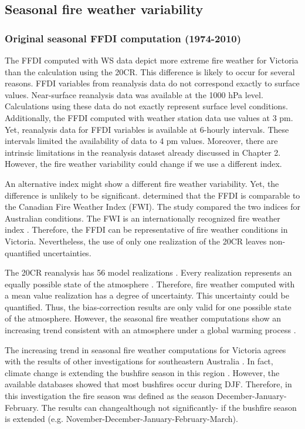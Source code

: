 \subsection{Seasonal fire weather variability \label{sub:Seasonal-fire-weather-variability}}


\subsubsection{Original seasonal FFDI computation (1974-2010)}

The FFDI computed with WS data depict more extreme fire weather for
Victoria than the calculation using the 20CR. This difference is likely
to occur for several reasons. FFDI variables from reanalysis data
do not correspond exactly to surface values. Near-surface reanalysis
data was available at the 1000 hPa level. Calculations using these
data do not exactly represent surface level conditions. Additionally,
the FFDI computed with weather station data use values at 3 pm. Yet,
reanalysis data for FFDI variables is available at 6-hourly intervals.
These intervals limited the availability of data to 4 pm values. Moreover,
there are intrinsic limitations in the reanalysis dataset already
discussed in Chapter 2. However, the fire weather variability could
change if we use a different index. 

An alternative index might show a different fire weather variability.
Yet, the difference is unlikely to be significant. \citet{Dowdy2009}
determined that the FFDI is comparable to the Canadian Fire
Weather Index (FWI). The study compared the two indices for Australian
conditions. The FWI is an internationally recognized fire weather
index \citep{VanWagner1974,VanWagner2005,Dowdy2009a}. Therefore,
the FFDI can be representative of fire weather conditions in Victoria.
Nevertheless, the use of only one realization of the 20CR leaves non-quantified
uncertainties. 

The 20CR reanalysis has 56 model realizations \citep{Compo2011}.
Every realization represents an equally possible state of the atmosphere
\citep{Compo2011}. Therefore, fire weather computed with a mean value
realization has a degree of uncertainty. This uncertainty could be
quantified. Thus, the bias-correction results are only valid for one
possible state of the atmosphere. However, the seasonal fire weather
computations show an increasing trend consistent with an atmosphere
under a global warming process \citep{Stocker2013}. 

The increasing trend in seasonal fire weather computations for Victoria
agrees with the results of other investigations for southeastern Australia
\citep{Lucas2007,Hennessy2005,Hasson2009,Clarke2013}. In fact, climate
change is extending the bushfire season in this region \citep{Clarke2011}.
However, the available databases showed that most bushfires occur
during DJF. Therefore, in this investigation the fire season was defined
as the season December-January-February. The results can change\textemdash although
not significantly- if the bushfire season is extended (e.g. November-December-January-February-March\textemdash ). 


